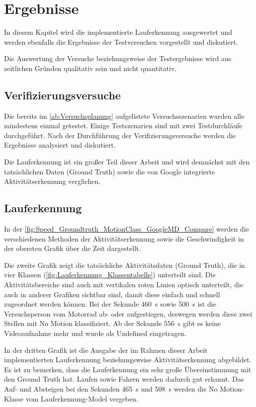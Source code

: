 \chapter{Ergebnisse}

In diesem Kapitel wird die implementierte Lauferkennung ausgewertet und werden ebenfalls die Ergebnisse der Testversuchen vorgestellt und diskutiert.

Die Auswertung der Versuche beziehungsweise der Testergebnisse wird aus zeitlichen Gründen qualitativ sein und nicht quantitativ.


\section{Verifizierungsversuche}

Die bereits im \autoref{ab:Versuchsplanung} aufgelistete Versuchsszenarien wurden alle mindestens einmal getestet. Einige Testszenarien sind mit zwei Testdurchläufe durchgeführt.
Nach der Durchführung der Verifizierungsversuche werden die Ergebnisse analysiert und diskutiert. 

Die Lauferkennung ist ein großer Teil dieser Arbeit und wird demnächst mit den tatsächlichen Daten (Ground Truth) sowie die von Google integrierte Aktivitäts\-erkennung verglichen.
\section{Lauferkennung}

In der \autoref{fig:Speed_Groundtruth_MotionClass_GoogleMD_Compare} werden die verschiedenen Methoden der Aktivitätserkennung sowie die Geschwindigkeit in der obersten Grafik über die Zeit dargestellt.

Die zweite Grafik zeigt die tatsächliche Aktivitätsdaten (Ground Truth), die in vier Klassen (\autoref{fig:Lauferkennung_Klassentabelle}) unterteilt sind. Die Aktivitätsbereiche sind auch mit vertikalen roten Linien optisch unterteilt, die auch in anderer Grafiken sichtbar sind, damit diese einfach und schnell zugeordnet werden können. Bei der Sekunde \SI{460}{\second} sowie \SI{500}{\second} ist die Versuchsperson vom Motorrad ab- oder aufgestiegen, deswegen werden diese zwei Stellen mit \glqq No Motion\grqq{} klassifiziert. Ab der Sekunde \SI{556}{\second} gibt es keine Videoaufnahme mehr und wurde als \glqq Undefined\grqq{} eingetragen.

In der dritten Grafik ist die Ausgabe der im Rahmen dieser Arbeit implementierten Lauferkennung beziehungsweise Aktivitätserkennung abgebildet. 
Es ist zu bemerken, dass die Lauferkennung ein sehr große Übereinstimmung mit den Ground Truth hat. Laufen sowie Fahren werden dadurch gut erkannt. Das Auf- und Absteigen bei den Sekunden \SI{465}{\second} und \SI{508}{\second} werden die \glqq No Motion\grqq{}-Klasse vom Lauferkennung-Model vergeben.

